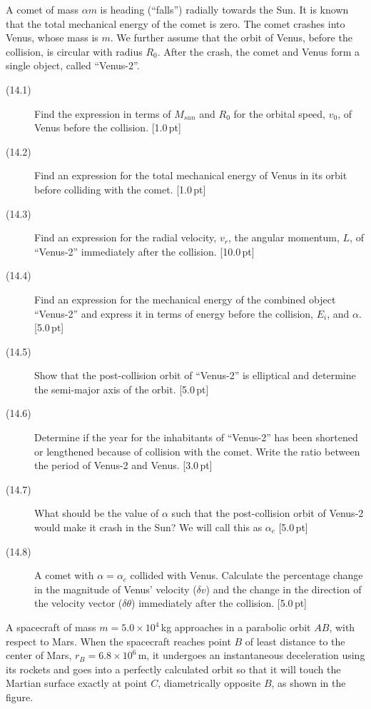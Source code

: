 A comet of mass $\alpha m$ is heading (``falls'') radially towards the Sun. It
is known that the total mechanical energy of the comet is zero. The comet
crashes into Venus, whose mass is $m$. We further assume that the orbit of
Venus, before the collision, is circular with radius $R_0$. After the crash,
the comet and Venus form a single object, called ``Venus-2''.


\begin{description}
\item[(14.1)] Find the expression in terms of $M_{sun}$ and $R_0$ for the
  orbital speed, $v_0$, of Venus before the collision. \hfill[1.0\,pt]
\item[(14.2)] Find an expression for the total mechanical energy of Venus in
  its orbit before colliding with the comet. \hfill[1.0\,pt]
\item[(14.3)] Find an expression for the radial velocity, $v_r$, the angular
  momentum, $L$, of ``Venus-2'' immediately after the collision.
  \hfill[10.0\,pt]
\item[(14.4)] Find an expression for the mechanical energy of the combined
  object ``Venus-2'' and express it in terms of energy before the collision,
  $E_i$, and $\alpha$. \hfill[5.0\,pt]
\item[(14.5)] Show that the post-collision orbit of ``Venus-2'' is elliptical
  and determine the semi-major axis of the orbit. \hfill[5.0\,pt]
\item[(14.6)] Determine if the year for the inhabitants of ``Venus-2'' has
  been shortened or lengthened because of collision with the comet. Write the
  ratio between the period of Venus-2 and Venus. \hfill[3.0\,pt]
\item[(14.7)] What should be the value of $\alpha$ such that the
  post-collision orbit of Venus-2 would make it crash in the Sun? We will call
  this as $\alpha_c$ \hfill[5.0\,pt]
\item[(14.8)] A comet with $\alpha = \alpha_c$ collided with Venus. Calculate
  the percentage change in the magnitude of Venus' velocity ($\delta v$) and
  the change in the direction of the velocity vector ($\delta\theta$)
  immediately after the collision. \hfill[5.0\,pt]
\end{description}

A spacecraft of mass $m = 5.0 \times 10^4$\,kg approaches in a parabolic orbit
$AB$, with respect to Mars. When the spacecraft reaches point $B$ of least
distance to the center of Mars, $r_B = 6.8 \times 10^6$\,m, it undergoes an
instantaneous deceleration using its rockets and goes into a perfectly
calculated orbit so that it will touch the Martian surface exactly at point
$C$, diametrically opposite $B$, as shown in the figure.

